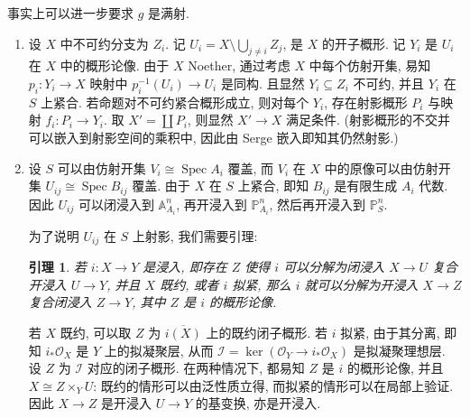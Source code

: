 \documentclass{article}
\theoremstyle{exercise}
\theoremstyle{plain}
\newtheorem*{lemma*}{引理}
\theoremstyle{remark}
\newenvironment{proofc}{\proof}{\endproof}
\def\A{\mathbb{A}}
\def\P{\mathbb{P}}
\def\cO{\mathscr{O}}
\def\Spec{\operatorname{Spec}}
\begin{document}
\begin{proofc}
  事实上可以进一步要求 $g$ 是满射.
  \begin{enumerate}[label=(\alph*)]
    \item 设 $X$ 中不可约分支为 $Z_i$.
          记 $U_i = X \setminus \bigcup_{j \neq i} Z_j$, 是 $X$ 的开子概形.
          记 $Y_i$ 是 $U_i$ 在 $X$ 中的概形论像.
          由于 $X$ Noether, 通过考虑 $X$ 中每个仿射开集,
          易知 $p_i \colon Y_i \to X$ 映射中 $p_i^{-1}(U_i) \to U_i$ 是同构.
          且显然 $Y_i \subseteq Z_i$ 不可约, 并且 $Y_i$ 在 $S$ 上紧合.
          若命题对不可约紧合概形成立, 则对每个 $Y_i$,
          存在射影概形 $P_i$ 与映射 $f_i \colon P_i \to Y_i$.
          取 $X' = \coprod P_i$, 则显然 $X' \to X$ 满足条件.
          (射影概形的不交并可以嵌入到射影空间的乘积中, 因此由 Serge 嵌入即知其仍然射影.)
    \item 设 $S$ 可以由仿射开集 $V_i \cong \Spec A_i$ 覆盖,
          而 $V_i$ 在 $X$ 中的原像可以由仿射开集 $U_{ij} \cong \Spec B_{ij}$ 覆盖.
          由于 $X$ 在 $S$ 上紧合, 即知 $B_{ij}$ 是有限生成 $A_i$ 代数.
          因此 $U_{ij}$ 可以闭浸入到 $\A_{A_i}^n$,
          再开浸入到 $\P_{A_i}^n$, 然后再开浸入到 $\P_S^n$.

          为了说明 $U_{ij}$ 在 $S$ 上射影, 我们需要引理:

          \begin{lemma*}
            若 $i \colon X \to Y$ 是浸入, 即存在 $Z$ 使得 $i$ 可以分解为闭浸入 $X \to U$
            复合开浸入 $U \to Y$, 并且 $X$ 既约, 或者 $i$ 拟紧,
            那么 $i$ 就可以分解为开浸入 $X \to Z$ 复合闭浸入 $Z \to Y$,
            其中 $Z$ 是 $i$ 的概形论像.
          \end{lemma*}

          \begin{proofc}
            若 $X$ 既约, 可以取 $Z$ 为 $\overline{i(X)}$ 上的既约闭子概形.
            若 $i$ 拟紧, 由于其分离, 即知 $i_*\cO_X$ 是 $Y$ 上的拟凝聚层,
            从而 $\mathcal{I} = \ker(\cO_Y \to i_*\cO_X)$ 是拟凝聚理想层.
            设 $Z$ 为 $\mathcal{I}$ 对应的闭子概形.
            在两种情况下, 都易知 $Z$ 是 $i$ 的概形论像, 并且 $X \cong Z \times_Y U$:
            既约的情形可以由泛性质立得, 而拟紧的情形可以在局部上验证.
            因此 $X \to Z$ 是开浸入 $U \to Y$ 的基变换, 亦是开浸入.
          \end{proofc}


\end{enumerate}
\end{proofc}
\end{document}
